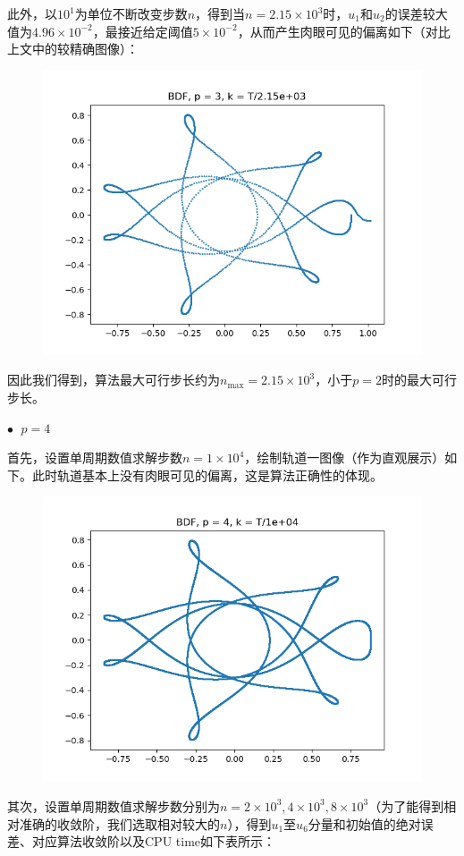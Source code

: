 \documentclass{ctexart}
\begin{document}
\begin{sloppypar}
此外，以$10^1$为单位不断改变步数$n$，得到当$n = 2.15 \times 10^3$时，$u_1$和$u_2$的误差较大值为$4.96 \times 10^{-2}$，最接近给定阈值$5 \times 10^{-2}$，从而产生肉眼可见的偏离如下（对比上文中的较精确图像）：
\begin{figure}[H]
\centering
\includegraphics[scale = 0.45]{./report_src/Figure_61.png}
\end{figure}
因此我们得到，算法最大可行步长约为$n_{\max} = 2.15 \times 10^3$，小于$p=2$时的最大可行步长。

$\bullet \;$ $p = 4$

首先，设置单周期数值求解步数$n = 1 \times 10^4$，绘制轨道一图像（作为直观展示）如下。此时轨道基本上没有肉眼可见的偏离，这是算法正确性的体现。
\begin{figure}[H]
\centering
\includegraphics[scale = 0.45]{./report_src/Figure_62.png}
\end{figure}
其次，设置单周期数值求解步数分别为$n = 2 \times 10^3,4 \times 10^3,8 \times 10^3$（为了能得到相对准确的收敛阶，我们选取相对较大的$n$），得到$u_1$至$u_6$分量和初始值的绝对误差、对应算法收敛阶以及CPU time如下表所示：


\end{sloppypar}
\end{document}

